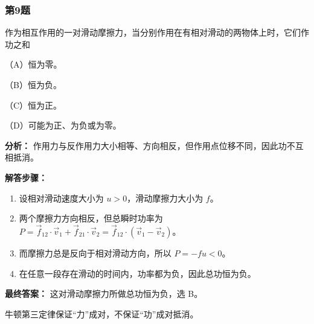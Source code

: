 \documentclass[12pt,a4paper]{ctexart}
\begin{document}
\subsubsection*{第9题}
\begin{tcolorbox}[colback=gray!2!white,colframe=black!60,title={题目}]
作为相互作用的一对滑动摩擦力，当分别作用在有相对滑动的两物体上时，它们作功之和\par
（A）恒为零。\par
（B）恒为负。\par
（C）恒为正。\par
（D）可能为正、为负或为零。\par
\end{tcolorbox}
\begin{tcolorbox}[colback=blue!2!white,colframe=blue!55!black,title={完整答案}]
\textbf{分析：}
作用力与反作用力大小相等、方向相反，但作用点位移不同，因此功不互相抵消。\par
\textbf{解答步骤：}
\begin{enumerate}
\item 设相对滑动速度大小为 \(u>0\)，滑动摩擦力大小为 \(f\)。
\item 两个摩擦力方向相反，但总瞬时功率为 \(P=\vec f_{12}\cdot \vec v_1+\vec f_{21}\cdot \vec v_2=\vec f_{12}\cdot (\vec v_1-\vec v_2)\)。
\item 而摩擦力总是反向于相对滑动方向，所以 \(P=-fu<0\)。
\item 在任意一段存在滑动的时间内，功率都为负，因此总功恒为负。
\end{enumerate}
\textbf{最终答案：}
这对滑动摩擦力所做总功恒为负，选 B。\par
\end{tcolorbox}
\begin{tcolorbox}[colback=red!2!white,colframe=red!55!black,title={易错点}]
牛顿第三定律保证“力”成对，不保证“功”成对抵消。\par
\end{tcolorbox}
\end{document}

